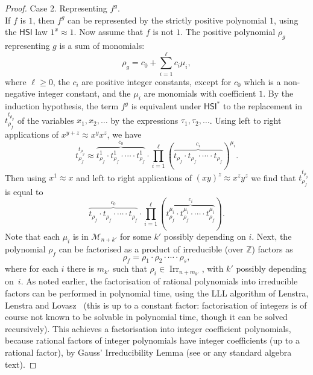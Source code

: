 \documentclass[eqnor,reqno]{amsart}
\theoremstyle{plain}
\theoremstyle{definition}
\newcommand{\Irr}{\operatorname{Irr}}
\newcommand{\HSI}{\textsf{HSI}}
\begin{document}
\begin{proof}
Case 2.  Representing $f^g$.\\
If $f$ is  $1$, then $f^g$ can be represented by the strictly positive polynomial $1$, using the $\HSI$ law $1^x\approx 1$.  Now assume that $f$ is not $1$.  The positive polynomial $\rho_g$ representing $g$ is a sum of monomials:
\[
\rho_g = c_0+\sum_{i=1}^\ell c_i\mu_i,
\] 
where $\ell\geq 0$, the $c_i$ are positive integer constants, except for $c_0$ which is a non-negative integer constant, and the $\mu_i$ are monomials with coefficient $1$.  By the induction hypothesis, the term $f^g$ is equivalent under $\HSI^*$ to the replacement in~$t_{\rho_f}^{t_{\rho_g}}$ of the variables $x_1,x_2,\dots$ by the expressions $\tau_1,\tau_2,\dots$.  Using left to right applications of $x^{y+z}\approx x^yx^z$, 
we have 
\begin{equation}
t_{\rho_f}^{t_{\rho_g}} \approx {}\stackrel{c_0}{\overbrace{t_{\rho_f}^1\cdot t_{\rho_f}^1\cdot\cdots\cdot t_{\rho_f}^1}}\cdot\prod_{i=1}^{\ell}(\stackrel{c_i}{\overbrace{t_{\rho_f}\cdot t_{\rho_f}\cdot\cdots \cdot t_{\rho_f}}})^{\mu_i}.\label{eqn:wilkie1}
\end{equation}
Then using $x^1\approx x$ and left to right applications of $(xy)^z\approx x^zy^z$ we find that $t_{\rho_f}^{t_{\rho_g}}$ is equal to 
\begin{equation}
\stackrel{c_0}{\overbrace{t_{\rho_f}\cdot t_{\rho_f}\cdot\cdots\cdot t_{\rho_f}}}\cdot \prod_{i=1}^{\ell}(\stackrel{c_i}{\overbrace{t_{\rho_f}^{\mu_i}\cdot t_{\rho_f}^{\mu_i}\cdot\cdots\cdot t_{\rho_f}^{\mu_i}}}).\label{eqn:wilkie2}
\end{equation}
Note that each $\mu_i$ is in $\mathcal{M}_{n+k'}$ for some $k'$ possibly depending on $i$.
Next, the polynomial $\rho_f$ can be factorised as a product of irreducible (over $\mathbb{Z}$) factors as 
\[
\rho_f=\rho_1\cdot\rho_2\cdot \cdots\cdot \rho_s,
\]
where for each $i$ there is $m_{k'}$ such that $\rho_i\in \Irr_{n+m_{k'}}$, with $k'$ possibly depending on~$i$.  
As noted earlier, the factorisation of rational polynomials into irreducible factors can be performed in polynomial time, using the LLL algorithm of Lenstra, Lenstra and Lovasz~\cite{LLL} (this is up to a constant factor: factorisation of integers is of course not known to be solvable in polynomial time, though it can be solved recursively).  
This achieves a factorisation into integer coefficient polynomials, because rational factors of integer polynomials have integer coefficients (up to a rational factor), by Gauss' Irreducibility Lemma (see \cite[Theorem III.15]{birmac} or any standard algebra text).


\end{proof}
\end{document}
